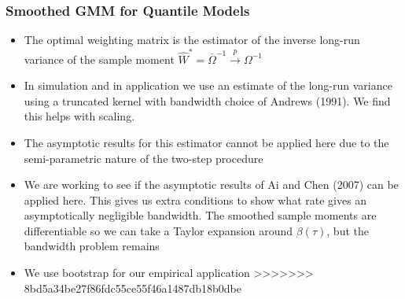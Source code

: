 \documentclass{beamer}
\begin{document}
\begin{frame}
\begin{itemize}
\begin{frame}
\begin{itemize}
\begin{frame}
\begin{itemize}
\begin{frame}
\frametitle{Smoothed GMM for Quantile Models}
\begin{itemize}
	\item The optimal weighting matrix is the estimator of the inverse long-run variance of the sample moment $\hat{W}^{*}=\bar{\Omega}^{-1}\overset{p}{\to}\Omega^{-1}$
	\item In simulation and in application we use an estimate of the long-run variance using a truncated kernel with bandwidth choice of Andrews (1991). We find this helps with scaling.
	
	\item The asymptotic results for this estimator cannot be applied here due to the semi-parametric nature of the two-step procedure
	\item We are working to see if the asymptotic results of Ai and Chen (2007) can be applied here. This gives us extra conditions to show what rate gives an asymptotically negligible bandwidth. The smoothed sample moments are differentiable so we can take a Taylor expansion around $\beta(\tau)$, but the bandwidth problem remains
	
	\item We use bootstrap for our empirical application
>>>>>>> 8bd5a34be27f86fdc55ce55f46a1487db18b0dbe
\end{itemize}
\end{frame}


\end{itemize}
\end{frame}
\end{itemize}
\end{frame}
\end{itemize}
\end{frame}
\end{document}
